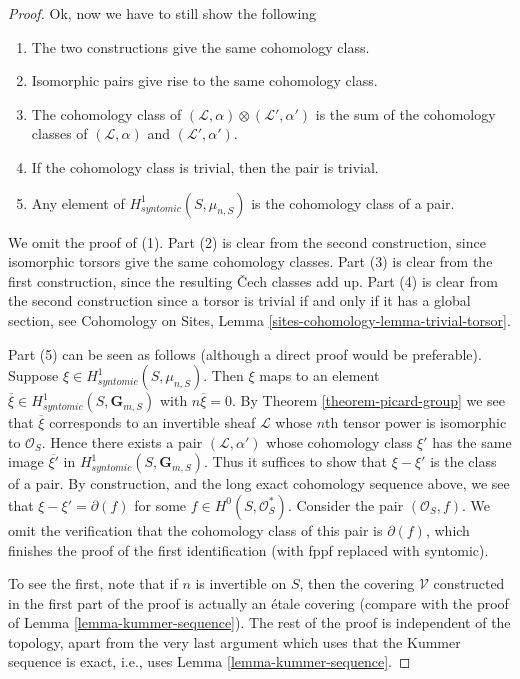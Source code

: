 \begin{proof}
\medskip\noindent
Ok, now we have to still show the following
\begin{enumerate}
\item The two constructions give the same cohomology class.
\item Isomorphic pairs give rise to the same cohomology class.
\item The cohomology class of
$(\mathcal{L}, \alpha) \otimes (\mathcal{L}', \alpha')$
is the sum of the cohomology classes of
$(\mathcal{L}, \alpha)$ and $(\mathcal{L}', \alpha')$.
\item If the cohomology class is trivial, then the pair is trivial.
\item Any element of $H^1_{syntomic}(S, \mu_{n, S})$ is the
cohomology class of a pair.
\end{enumerate}
We omit the proof of (1). Part (2) is clear from the second construction,
since isomorphic torsors give the same cohomology classes.
Part (3) is clear from the first construction, since the resulting
{\v C}ech classes add up. Part (4) is clear from the second construction
since a torsor is trivial if and only if it has a global section, see
Cohomology on Sites, Lemma \ref{sites-cohomology-lemma-trivial-torsor}.

\medskip\noindent
Part (5) can be seen as follows (although a direct proof would be
preferable). Suppose $\xi \in H^1_{syntomic}(S, \mu_{n, S})$.
Then $\xi$ maps to an element
$\overline{\xi} \in H^1_{syntomic}(S, \mathbf{G}_{m, S})$
with $n \overline{\xi} = 0$. By
Theorem \ref{theorem-picard-group}
we see that $\overline{\xi}$ corresponds to an invertible sheaf $\mathcal{L}$
whose $n$th tensor power is isomorphic to $\mathcal{O}_S$.
Hence there exists a pair $(\mathcal{L}, \alpha')$ whose cohomology
class $\xi'$ has the same image $\overline{\xi'}$ in
$H^1_{syntomic}(S, \mathbf{G}_{m, S})$. Thus it suffices to show
that $\xi - \xi'$ is the class of a pair. By construction, and the
long exact cohomology sequence above, we see that
$\xi - \xi' = \partial(f)$ for some $f \in H^0(S, \mathcal{O}_S^*)$.
Consider the pair $(\mathcal{O}_S, f)$. We omit the verification
that the cohomology class of this pair is $\partial(f)$, which
finishes the proof of the first identification (with fppf replaced
with syntomic).

\medskip\noindent
To see the first, note that if $n$ is invertible on $S$, then the
covering $\mathcal{V}$ constructed in the first part of the proof
is actually an \'etale covering (compare with the proof of
Lemma \ref{lemma-kummer-sequence}). The rest of the proof is independent
of the topology, apart from the very last argument which uses that
the Kummer sequence is exact, i.e., uses Lemma \ref{lemma-kummer-sequence}.
\end{proof}






